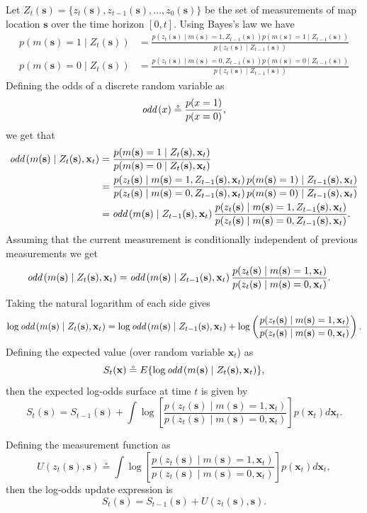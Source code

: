 \documentclass{article}
\newcommand{\defeq}{\circeq}
\newcommand{\odd}[1]{\text{\em odd}\left(#1\right)}
\newcommand{\sbf}{\mathbf{s}}
\newcommand{\xbf}{\mathbf{x}}
\begin{document}
Let $Z_t(\sbf) = \{z_t(\sbf), z_{t-1}(\sbf), \dots, z_0(\sbf)\}$ be the set of measurements of map location $\sbf$ over the time horizon $[0, t]$.  Using Bayes's law we have
\begin{align*}
	p(m(\sbf)=1 \mid Z_t(\sbf)) &= \frac{p(z_t(\sbf)\mid m(\sbf)=1, Z_{t-1}(\sbf)) p(m(\sbf)=1 \mid Z_{t-1}(\sbf))}{p(z_t(\sbf) \mid Z_{t-1}(\sbf))} \\
	p(m(\sbf)=0 \mid Z_t(\sbf)) &= \frac{p(z_t(\sbf)\mid m(\sbf)=0, Z_{t-1}(\sbf)) p(m(\sbf)=0 \mid Z_{t-1}(\sbf))}{p(z_t(\sbf) \mid Z_{t-1}(\sbf))}
\end{align*}
Defining the odds of a discrete random variable as
\[
\odd{x} \defeq \frac{p(x=1)}{p(x=0)},
\]
we get that 
\begin{align*}
	\odd{m(\sbf)\mid Z_t(\sbf), \xbf_t} &= \frac{p(m(\sbf)=1 \mid Z_t(\sbf), \xbf_t)}{p(m(\sbf)=0 \mid Z_t(\sbf), \xbf_t)} \\
	&= \frac{p(z_t(\sbf) \mid m(\sbf)=1, Z_{t-1}(\sbf), \xbf_t) \, p(m(\sbf)=1)\mid Z_{t-1}(\sbf), \xbf_t)}{p(z_t(\sbf)\mid m(\sbf)=0, Z_{t-1}(\sbf), \xbf_t) \, p(m(\sbf)=0)\mid Z_{t-1}(\sbf), \xbf_t)} \\
	&= \odd{m(\sbf) \mid Z_{t-1}(\sbf), \xbf_t}  \frac{p(z_t(\sbf)\mid m(\sbf)=1, Z_{t-1}(\sbf), \xbf_t)}{p(z_t(\sbf)\mid m(\sbf)=0, Z_{t-1}(\sbf), \xbf_t)}.
\end{align*}
Assuming that the current measurement is conditionally independent of previous measurements we get
\begin{align*}
	\odd{m(\sbf)\mid Z_t(\sbf), \xbf_t} 
		&= \odd{m(\sbf) \mid Z_{t-1}(\sbf), \xbf_t}  \frac{p(z_t(\sbf)\mid m(\sbf)=1, \xbf_t)}{p(z_t(\sbf)\mid m(\sbf)=0, \xbf_t)}.
\end{align*}
Taking the natural logarithm of each side gives
\[
\log\odd{m(\sbf)\mid Z_t(\sbf), \xbf_t} = \log \odd{m(\sbf) \mid Z_{t-1}(\sbf), \xbf_t} + \log\left(\frac{p(z_t(\sbf)\mid m(\sbf)=1, \xbf_t)}{p(z_t(\sbf)\mid m(\sbf)=0, \xbf_t)}\right).
\]
Defining the expected value (over random variable $\xbf_t$) as
\[
S_t(\xbf) \defeq E\{\log\odd{m(\sbf)\mid Z_t(\sbf), \xbf_t}\},
\]
then the expected log-odds surface at time $t$ is given by
\[
S_t(\sbf) = S_{t-1}(\sbf) + \int\log\left[ \frac{p(z_t(\sbf)\mid m(\sbf)=1, \xbf_t)}{p(z_t(\sbf)\mid m(\sbf)=0, \xbf_t)}\right]p(\xbf_t)d\xbf_t.
\] 

Defining the measurement function as 
\begin{equation} \label{eq:measurement_function}
U(z_t(\sbf), \sbf) \defeq \int\log\left[ \frac{p(z_t(\sbf)\mid m(\sbf)=1, \xbf_t)}{p(z_t(\sbf)\mid m(\sbf)=0, \xbf_t)}\right]p(\xbf_t)d\xbf_t,	
\end{equation}
then the log-odds update expression is
\begin{equation}\label{eq:log_odds_surface_update}
S_t(\sbf) = S_{t-1}(\sbf) + U(z_t(\sbf), \sbf).
\end{equation}
\end{document}
